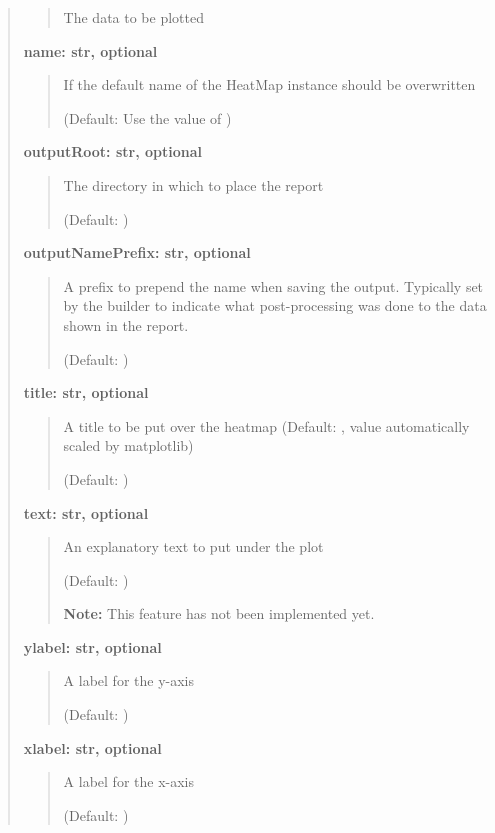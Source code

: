 \documentclass[letterpaper,10pt,english]{sphinxmanual}
\begin{document}
\begin{fulllineitems}
\begin{fulllineitems}
\begin{quote}
\begin{description}
\begin{quote}
The data to be plotted
\end{quote}

\textbf{name: str, optional}
\begin{quote}

If the default name of the HeatMap instance should be overwritten

(Default: Use the value of )
\end{quote}

\textbf{outputRoot: str, optional}
\begin{quote}

The directory in which to place the report

(Default: )
\end{quote}

\textbf{outputNamePrefix: str, optional}
\begin{quote}

A prefix to prepend the name when saving the output.
Typically set by the builder to indicate what post-processing
was done to the data shown in the report.

(Default: )
\end{quote}

\textbf{title: str, optional}
\begin{quote}

A title to be put over the heatmap
(Default: , value automatically scaled by matplotlib)

(Default: )
\end{quote}

\textbf{text: str, optional}
\begin{quote}

An explanatory text to put under the plot

(Default: )

\textbf{Note:} This feature has not been implemented yet.
\end{quote}

\textbf{ylabel: str, optional}
\begin{quote}

A label for the y-axis

(Default: )
\end{quote}

\textbf{xlabel: str, optional}
\begin{quote}

A label for the x-axis

(Default: )
\end{quote}


\end{description}
\end{quote}
\end{fulllineitems}
\end{fulllineitems}
\end{document}

